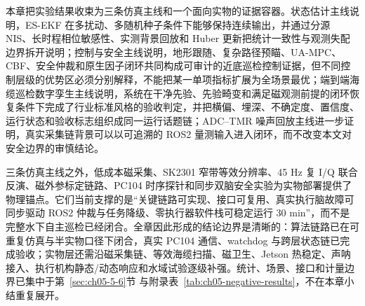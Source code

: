 本章把实验结果收束为三条仿真主线和一个面向实物的证据容器。状态估计主线说明，ES-EKF 在多扰动、多随机种子条件下能够保持连续输出，并通过分源 NIS、长时程相位敏感性、实测背景回放和 Huber 更新把统计一致性与观测失配边界拆开说明；控制与安全主线说明，地形跟随、复杂路径预瞄、UA-MPC、CBF、安全仲裁和原生因子闭环共同构成可审计的近底巡检控制证据，但不同控制层级的优势区必须分别解释，不能把某一单项指标扩展为全场景最优；端到端海缆巡检数字孪生主线说明，系统在干净先验、先验畸变和满足磁观测前提的闭环恢复条件下完成了行业标准风格的验收判定，并把横偏、埋深、不确定度、置信度、运行状态和验收标志组织成同一运行话题链；ADC--TMR 噪声回放主线进一步证明，真实采集链背景可以以可追溯的 ROS2 量测输入进入闭环，而不改变本文对安全边界的审慎结论。

三条仿真主线之外，低成本磁采集、SK2301 窄带等效分辨率、45 Hz 复 I/Q 联合反演、磁外参标定链路、PC104 时序探针和同步双脑安全实验为实物部署提供了物理锚点。它们当前支撑的是``关键链路可实现、接口可复用、真实执行脑故障可同步驱动 ROS2 仲裁与任务降级、零执行器软件栈可稳定运行 30 min''，而不是完整水下自主巡检已经闭合。全章因此形成的结论边界是清晰的：算法链路已在可重复仿真与半实物口径下闭合，真实 PC104 通信、watchdog 与跨层状态链已完成验收；实物层还需沿磁采集链、等效海缆扫描、磁卫生、Jetson 热稳定、声呐接入、执行机构静态/动态响应和水域试验逐级补强。统计、场景、接口和计量边界已集中于第~\ref{sec:ch05-5-6}节 与附录表~\ref{tab:ch05-negative-results}，不在本章小结重复展开。

